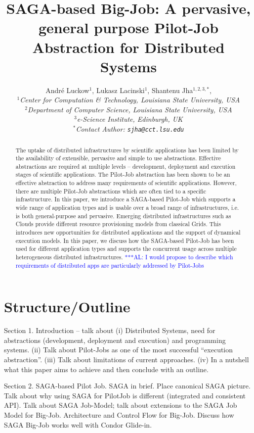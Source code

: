 \documentclass[conference,final]{IEEEtran}
\title{SAGA-based Big-Job: A pervasive, general purpose Pilot-Job Abstraction for Distributed Systems}
\author{
Andr\'e Luckow$^{1}$, Lukasz Lacinski$^{1}$,   Shantenu Jha$^{1,2,3,*}$,\\
  \small{\emph{$^{1}$Center for Computation \& Technology, Louisiana State University, USA}}\\
  \small{\emph{$^{2}$Department of Computer Science, Louisiana State University, USA}}\\
  \small{\emph{$^{3}$e-Science Institute, Edinburgh, UK}}\\
  \small{\emph{$^{*}$Contact Author: \texttt{sjha@cct.lsu.edu}}}\\
}
\newcommand{\up}{\vspace*{-1em}}
\newcommand{\alnote}[1]{ {\textcolor{blue} { ***AL: #1 }}}
\newcommand{\alnote}[1]{}
\begin{document}
 

\maketitle    


\begin{abstract}
  The uptake of distributed infrastructures by scientific applications
  has been limited by the availability of extensible, pervasive and
  simple to use abstractions. Effective abstractions are required at
  multiple levels -- development, deployment and execution stages of
  scientific applications. The Pilot-Job abstraction has been shown to
  be an effective abstraction to address many requirements of
  scientific applications. However, there are multiple Pilot-Job
  abstractions which are often tied to a specific infrastructure.  In
  this paper, we introduce a SAGA-based Pilot-Job which supports a
  wide range of application types and is usable over a broad range of
  infrastructures, i.e. is both general-purpose and pervasive.
  Emerging distributed infrastructures such as Clouds provide different
  resource provisioning models from classical Grids. This introduces
  new opportunities for distributed applications and the support of
  dynamical execution models. In this paper, we discuss how the
  SAGA-based Pilot-Job has been used for different application types
  and supports the concurrent usage across multiple heterogeneous
  distributed infrastructures.
  \alnote{I would propose to describe which requirements of distributed
  apps are particularly addressed by Pilot-Jobs}
\end{abstract}


\section*{Structure/Outline}

Section 1. Introduction -- talk about (i) Distributed Systems, need
for abstractions (development, deployment and execution) and
programming systems. (ii) Talk about Pilot-Jobs as one of the most
successful ``execution abstraction''. (iii) Talk about limitations of
current approaches. (iv) In a nutshell what this paper aims to achieve
and then conclude with an outline.

\bigskip

Section 2. SAGA-based Pilot Job.  SAGA in brief. Place canonical SAGA
picture. Talk about why using SAGA for PilotJob is different
(integrated and consistent API). Talk about SAGA Job-Model; talk about
extensions to the SAGA Job Model for Big-Job.  Architecture and Control
Flow for Big-Job. Discuss how SAGA Big-Job works well with Condor
Glide-in.
\end{document}
